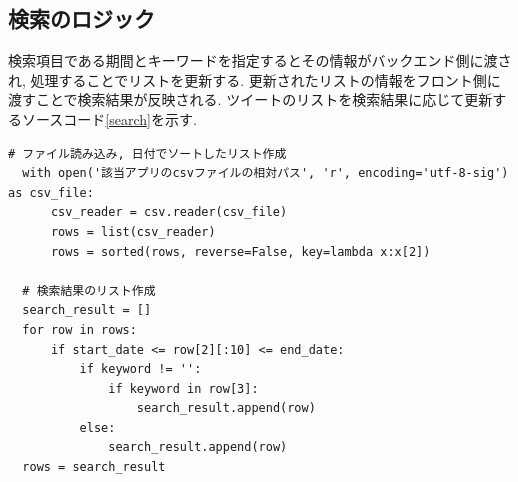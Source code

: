 \subsection{検索のロジック}
検索項目である期間とキーワードを指定するとその情報がバックエンド側に渡され, 処理することでリストを更新する. 更新されたリストの情報をフロント側に渡すことで検索結果が反映される. 
ツイートのリストを検索結果に応じて更新するソースコード\ref{search}を示す. 

\begin{lstlisting}[caption=view.py, label=search]
  # ファイル読み込み, 日付でソートしたリスト作成
  with open('該当アプリのcsvファイルの相対パス', 'r', encoding='utf-8-sig') as csv_file:
      csv_reader = csv.reader(csv_file)
      rows = list(csv_reader)
      rows = sorted(rows, reverse=False, key=lambda x:x[2])

  # 検索結果のリスト作成
  search_result = []
  for row in rows:
      if start_date <= row[2][:10] <= end_date:
          if keyword != '':
              if keyword in row[3]:
                  search_result.append(row)
          else:
              search_result.append(row)
  rows = search_result
\end{lstlisting}


